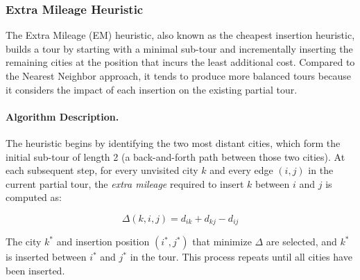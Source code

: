 \documentclass{article}
\begin{document}

\subsubsection{Extra Mileage Heuristic}

The Extra Mileage (EM) heuristic, also known as the cheapest insertion heuristic, builds
a tour by starting with a minimal sub-tour and incrementally inserting the remaining cities
at the position that incurs the least additional cost. Compared to the Nearest Neighbor
approach, it tends to produce more balanced tours because it considers the impact of each
insertion on the existing partial tour.

\paragraph{Algorithm Description.}
The heuristic begins by identifying the two most distant cities, which form the initial
sub-tour of length 2 (a back-and-forth path between those two cities). At each subsequent
step, for every unvisited city $k$ and every edge $(i, j)$ in the current partial tour,
the \textit{extra mileage} required to insert $k$ between $i$ and $j$ is computed as:

\[
\Delta(k, i, j) = d_{ik} + d_{kj} - d_{ij}
\]

The city $k^*$ and insertion position $(i^*, j^*)$ that minimize $\Delta$ are selected, and
$k^*$ is inserted between $i^*$ and $j^*$ in the tour. This process repeats until all cities
have been inserted.
\end{document}
